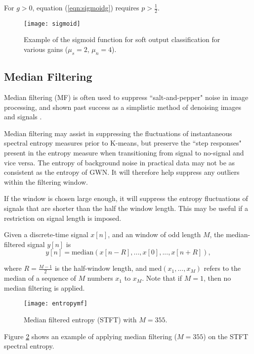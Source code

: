 For $g>0$, equation (\ref{eqn:sigmoidg}) requires $p > \frac{1}{2}$.

\begin{figure}[!t]
	\centering
	\texttt{[image: sigmoid]}
	\caption[Example of the sigmoid function.]{Example of the sigmoid function for soft output classification for various gains ($\mu_s=2$, $\mu_n=4$).}
	\label{fig:sigmoid}
\end{figure}



\subsection{Median Filtering}
Median filtering (MF) is often used to suppress ``salt-and-pepper" noise in image processing, and shown past success as a simplistic method of denoising images and signals \citep{mf1, mf2}.

Median filtering  may assist in suppressing the fluctuations of instantaneous spectral entropy measures prior to K-means, but preserve the ``step responses" present in the entropy measure when transitioning from signal to no-signal and vice versa. The entropy of background noise in practical data may not be as consistent as the entropy of GWN. It will therefore help suppress any outliers within the filtering window.

If the window is chosen large enough, it will suppress the entropy fluctuations of signals that are shorter than the half the window length. This may be useful if a restriction on signal length is imposed.

Given a discrete-time signal $x[n]$, and an window of odd length $M$, the median-filtered signal $y[n]$ is
\begin{equation*}
	y[n] = \text{median}(x[n - R], ..., x[0], ..., x[n + R] ),
\end{equation*}

\noindent where $R = \frac{M-1}{2}$ is the half-window length, and $\text{med}(x_1, ..., x_M)$ refers to the median of a sequence of $M$ numbers $x_1$ to $x_M$. Note that if $M=1$, then no median filtering is applied.

\begin{figure}[h!]
	\centering
	\texttt{[image: entropymf]}
	\caption[Median filtered entropy.]{Median filtered entropy (STFT) with $M=355$.}
	\label{fig:entropymf}
\end{figure}

Figure \ref{fig:entropymf} shows an example of applying median filtering ($M=355$) on the STFT spectral entropy.

